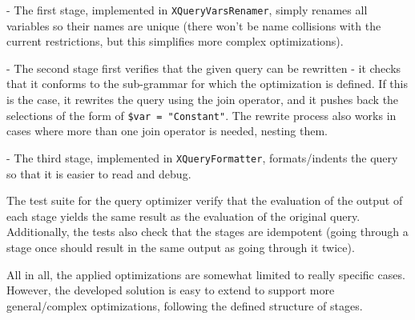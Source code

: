 \documentclass[paper=letter, fontsize=11pt]{scrartcl}
\begin{document}
- The first stage, implemented in \texttt{XQueryVarsRenamer}, simply renames all variables so their names are unique (there won't be name collisions with the current restrictions, but this simplifies more complex optimizations).

- The second stage first verifies that the given query can be rewritten - it checks that it conforms to the sub-grammar for which the optimization is defined.
If this is the case, it rewrites the query using the join operator, and it pushes back the selections of the form of \texttt{\$var = "Constant"}.
The rewrite process also works in cases where more than one join operator is needed, nesting them.

- The third stage, implemented in \texttt{XQueryFormatter}, formats/indents the query so that it is easier to read and debug.

The test suite for the query optimizer verify that the evaluation of the output of each stage yields the same result as the evaluation of the original query.
Additionally, the tests also check that the stages are idempotent (going through a stage once should result in the same output as going through it twice).

All in all, the applied optimizations are somewhat limited to really specific cases.
However, the developed solution is easy to extend to support more general/complex optimizations, following the defined structure of stages.
\end{document}
